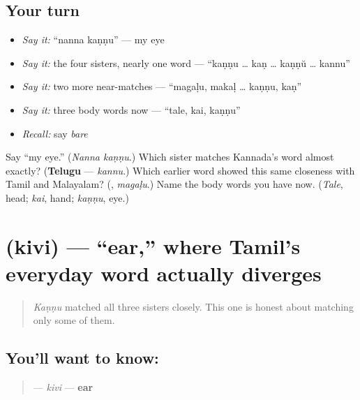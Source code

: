 \subsection*{Your turn}
\begin{itemize}
\raggedright
  \item \emph{Say it:} \textquotedblleft{}nanna kaṇṇu\textquotedblright{} — my eye
  \item \emph{Say it:} the four sisters, nearly one word — \textquotedblleft{}kaṇṇu … kaṇ … kaṇṇŭ … kannu\textquotedblright{}
  \item \emph{Say it:} two more near-matches — \textquotedblleft{}magaḷu, makaḷ … kaṇṇu, kaṇ\textquotedblright{}
  \item \emph{Say it:} three body words now — \textquotedblleft{}tale, kai, kaṇṇu\textquotedblright{}
  \item \emph{Recall:} say \emph{bare}
\end{itemize}

\begin{tcolorbox}[breakable,colback=teal!4,colframe=teal!35!black,title={Before you move on}]
Say \textquotedblleft{}my eye.\textquotedblright{} (\emph{Nanna kaṇṇu}.) Which sister matches Kannada's word almost exactly? (\textbf{Telugu} — \emph{kannu}.) Which earlier word showed this same closeness with Tamil and Malayalam? (\emph{\textbf{}}, \emph{magaḷu}.) Name the body words you have now. (\emph{Tale}, head; \emph{kai}, hand; \emph{kaṇṇu}, eye.)
\end{tcolorbox}
\section[\texorpdfstring{\kn{ಕಿವಿ} (kivi)}{ಕಿವಿ (kivi)}]{ (kivi) — \textquotedblleft{}ear,\textquotedblright{} where Tamil's everyday word actually diverges}

\label{lesson:KA-C37-kivi}



\begin{quote}
\emph{Kaṇṇu} matched all three sisters closely. This one is honest about matching only some of them.
\end{quote}

\subsection*{You'll want to know: }
\begin{quote}
\textbf{} — \emph{kivi} — \textbf{ear}
\end{quote}

